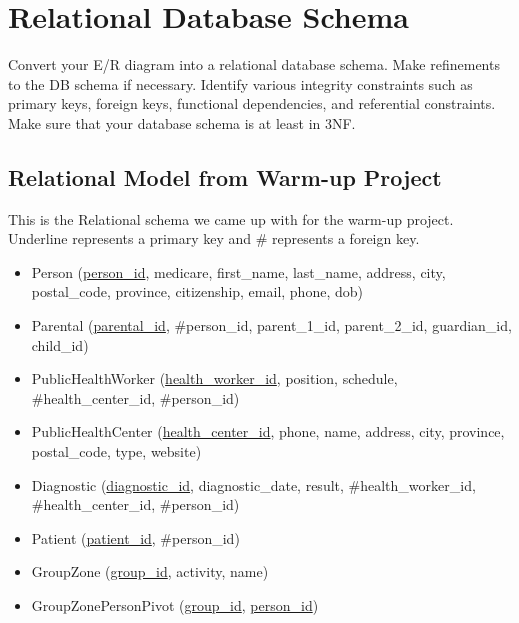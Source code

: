 \section{Relational Database Schema}
Convert your E/R diagram into a relational database schema. Make refinements to
the DB schema if necessary. Identify various integrity constraints such as primary
keys, foreign keys, functional dependencies, and referential constraints. Make sure
that your database schema is at least in 3NF.

\subsection{Relational Model from Warm-up Project}
This is the Relational schema we came up with for the warm-up project. Underline represents a primary key and \# represents a foreign key.
\begin{itemize}
    \item Person (\underline{person\_id}, medicare, first\_name, last\_name, address, city, postal\_code, province, citizenship, email, phone, dob)
    \item Parental (\underline{parental\_id}, \#person\_id, parent\_1\_id, parent\_2\_id, guardian\_id, child\_id)
    \item PublicHealthWorker (\underline{health\_worker\_id}, position, schedule,  \#health\_center\_id, \#person\_id)
    \item PublicHealthCenter (\underline{health\_center\_id}, phone, name, address, city, province, postal\_code, type, website)
    \item Diagnostic (\underline{diagnostic\_id}, diagnostic\_date, result, \#health\_worker\_id, \#health\_center\_id, \#person\_id)
    \item Patient (\underline{patient\_id}, \#person\_id)
    \item GroupZone (\underline{group\_id}, activity, name)
    \item GroupZonePersonPivot (\underline{group\_id}, \underline{person\_id})
\end{itemize}

